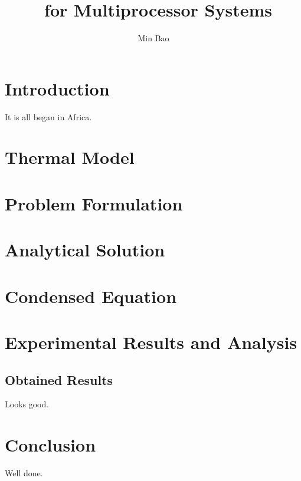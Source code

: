\documentclass[11pt,a4paper]{article}
\author{Min Bao}
\title{\ssdtc\ for Multiprocessor Systems}
\begin{document}
  \maketitle

  \section{Introduction}
  It is all began in Africa.

  \section{Thermal Model}
  

  \section{Problem Formulation}
  

  \section{Analytical Solution}
  

  \section{Condensed Equation} \label{condensed-equation}
  

  \section{Experimental Results and Analysis}
  

  \subsection{Obtained Results}
  Looks good.

  \section{Conclusion}
  Well done.

  
\end{document}

